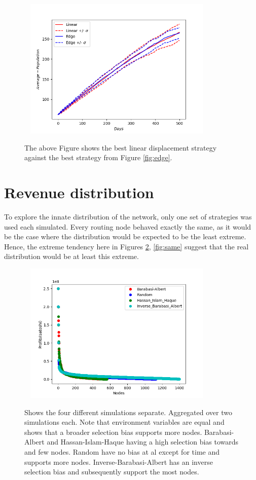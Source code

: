 \begin{figure}[!htb]
	\hspace*{-0.7cm}\
	\centering
	\includegraphics[width=9cm]{images/histories_edge_linear.png}
	\caption{ The above Figure shows the best linear displacement strategy against the best strategy from Figure \ref{fig:edge}.
	}
	\label{fig:funding}
	\hspace*{2mm} 
\end{figure}

\newpage
\section{Revenue distribution}

To explore the innate distribution of the network, only one set of strategies was used each simulated. Every routing node behaved exactly the same, as it would be the case where the distribution would be expected to be the least extreme. Hence, the extreme tendency here in Figures \ref{fig:path}, \ref{fig:same} suggest that the real distribution would be at least this extreme.   

\begin{figure}[!htb]
	\hspace*{-0.7cm}\
	\centering
	\includegraphics[width=9cm]{images/wealth_distribution_path.png}
	\caption{ Shows the four different simulations separate. Aggregated over two simulations each. Note that environment variables are equal and shows that a broader selection bias supports more nodes. Barabasi-Albert and Hassan-Islam-Haque having a high selection bias towards and few nodes. Random have no bias at al except for time and supports more nodes. Inverse-Barabasi-Albert has an inverse selection bias and subsequently support the most nodes. 
	}
	\label{fig:path}

\end{figure}

